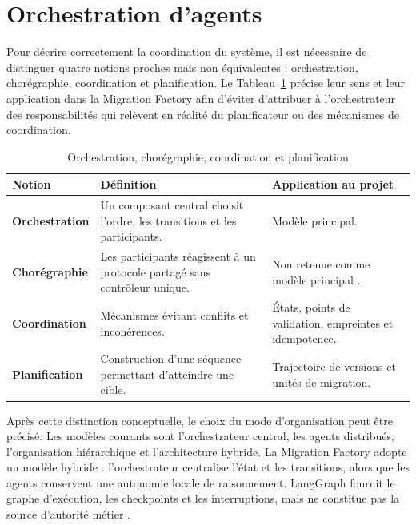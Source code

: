 \section{Orchestration d'agents}

Pour décrire correctement la coordination du système, il est nécessaire de distinguer quatre notions proches mais non équivalentes : orchestration, chorégraphie, coordination et planification. Le Tableau~\ref{tab:notions-orchestration-ch2} précise leur sens et leur application dans la Migration Factory afin d'éviter d'attribuer à l'orchestrateur des responsabilités qui relèvent en réalité du planificateur ou des mécanismes de coordination.

\begin{table}[H]
    \centering
    \caption{Orchestration, chorégraphie, coordination et planification}
    \label{tab:notions-orchestration-ch2}
    \small
    \begin{tabularx}{\textwidth}{|>{\bfseries\RaggedRight\arraybackslash}p{3cm}|>{\RaggedRight\arraybackslash}X|>{\RaggedRight\arraybackslash}p{4.2cm}|}
        \hline
        \rowcolor{cgilight!95}
        \textbf{Notion} & \textbf{Définition} & \textbf{Application au projet} \\
        \hline
        Orchestration & Un composant central choisit l'ordre, les transitions et les participants. & Modèle principal. \\
        \hline
        Chorégraphie & Les participants réagissent à un protocole partagé sans contrôleur unique. & Non retenue comme modèle principal \cite{w3c-choreography}. \\
        \hline
        Coordination & Mécanismes évitant conflits et incohérences. & États, points de validation, empreintes et idempotence. \\
        \hline
        Planification & Construction d'une séquence permettant d'atteindre une cible. & Trajectoire de versions et unités de migration. \\
        \hline
    \end{tabularx}
\end{table}

Après cette distinction conceptuelle, le choix du mode d'organisation peut être précisé. Les modèles courants sont l'orchestrateur central, les agents distribués, l'organisation hiérarchique et l'architecture hybride. La Migration Factory adopte un modèle hybride : l'orchestrateur centralise l'état et les transitions, alors que les agents conservent une autonomie locale de raisonnement. LangGraph fournit le graphe d'exécution, les checkpoints et les interruptions, mais ne constitue pas la source d'autorité métier \cite{langgraph-persistence}.

